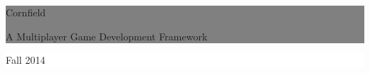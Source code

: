 %
%
%
%
	\thispagestyle{empty}

	\vspace*{\fill}

	\noindent \colorbox{gray}{
		\parbox{\textwidth}{%
			\color{white}%
			\begin{center}
				\Huge{{\selectfont Cornfield}} %
			\end{center}
			\begin{center}
			\Large{\textsf{A Multiplayer Game Development Framework}}\\
			[0.5cm] %
			\small{
			}
			\end{center}
		}}
		
	\vfill


	\begin{figure}[htbp]
	\centering
	\vspace{140px}
	\end{figure}
	
	\noindent \colorbox{white}{
		\begin{minipage}[b]{6.5cm}
		\begin{center}
			\end{center}
			\vspace*{-20px}
		\end{minipage}
	} 
	\hfill  
	\colorbox{white}{ 
		\begin{minipage}[b]{3.5cm}	 
			\flushright
			{\large Fall 2014} \\
		\end{minipage}
	}

\clearpage
